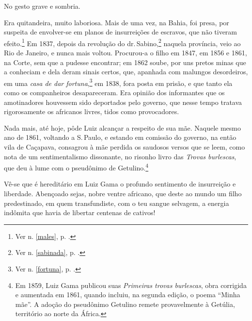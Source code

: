 
No gesto grave e sombria.

Era quitandeira, muito laboriosa. Mais de uma vez, na Bahia, foi presa,
por suspeita de envolver-se em planos de insurreições de escravos, que
não tiveram efeito.\footnote{Ver n. \ref{males}, p. \pageref{males}.} Em 1837, depois da revolução do dr.\,Sabino,\footnote{Ver n. \ref{sabinada}, p. \pageref{sabinada}.}
naquela província, veio ao Rio de Janeiro, e nunca mais voltou.
Procurou-a o filho em 1847, em 1856 e 1861, na Corte, sem que a pudesse
encontrar; em 1862 soube, por uns pretos minas que a conheciam e dela
deram sinais certos, que, apanhada com malungos desordeiros, em uma
\emph{casa de dar fortuna},\footnote{Ver n. \ref{fortuna}, p. \pageref{fortuna}.} em 1838, fora posta em
prisão, e que tanto ela como os companheiros desapareceram. Era opinião
dos informantes que os amotinadores houvessem sido deportados pelo
governo, que nesse tempo tratava rigorosamente os africanos livres,
tidos como provocadores.

Nada mais, até hoje, pôde Luiz alcançar a respeito de sua mãe. Naquele
mesmo ano de 1861, voltando a S.\,Paulo, e estando em comissão do
governo, na então vila de Caçapava, consagrou à mãe perdida os saudosos
versos que se leem, como nota de um sentimentalismo dissonante, no
risonho livro das \emph{Trovas burlescas}, que deu à lume com o
pseudônimo de Getulino.\footnote{Em 1859, Luiz Gama publicou suas
  \emph{Primeiras trovas burlescas}, obra corrigida e aumentada em 1861,
  quando incluiu, na segunda edição, o poema ``Minha mãe''. A adoção
  do pseudônimo Getulino remete provavelmente à Getúlia, território ao
  norte da África.}

Vê-se que é hereditário em Luiz Gama o profundo sentimento de
insurreição e liberdade. Abençoado sejas, nobre ventre africano, que
deste ao mundo um filho predestinado, em quem transfundiste, com o teu
sangue selvagem, a energia indômita que havia de libertar centenas de
cativos!

